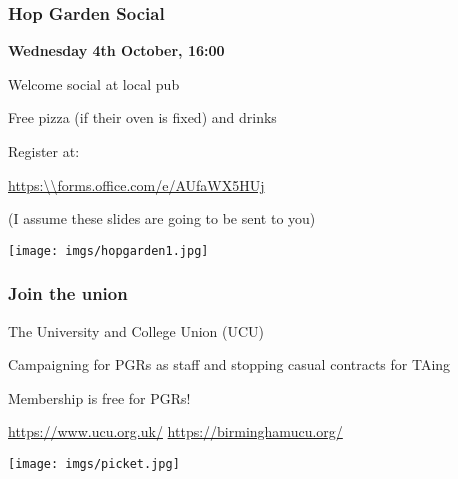 \documentclass[aspectratio=169]{beamer}
\newcommand{\imagewidth}{14em}
\begin{document}
\begin{frame}
    \frametitle{Hop Garden Social}
    \centering

    \textbf{\LARGE Wednesday 4th October, 16:00}

    \vspace{1em}

    \begin{minipage}{0.4\textwidth}
        \centering

        Welcome social at local pub

        Free \alert{pizza}
        {\scriptsize(if their oven is fixed)}
        and \alert{drinks}

        \vspace{1em}

        Register at:

        {\small\url{https:\\forms.office.com/e/AUfaWX5HUj}}

        \vspace{1em}

        \scriptsize
        (I assume these slides are going to be sent to you)
    \end{minipage}
    \qquad
    \begin{minipage}{0.4\textwidth}
        \texttt{[image: imgs/hopgarden1.jpg]}
    \end{minipage}
\end{frame}
\begin{frame}
    \frametitle{Join the union}
    \centering
    \begin{minipage}{0.40\textwidth}
        \centering
        The University and College Union (UCU)

        \vspace{1em}

        Campaigning for \alert{PGRs as staff} and stopping
        \alert{casual contracts} for TAing

        \vspace{1em}

        Membership is \alert{free} for PGRs!

        \vspace{1em}

        \url{https://www.ucu.org.uk/}
        \url{https://birminghamucu.org/}

    \end{minipage}
    \qquad
    \begin{minipage}{0.4\textwidth}
        \texttt{[image: imgs/picket.jpg]}
    \end{minipage}
\end{frame}
\end{document}
